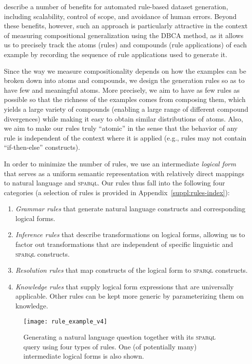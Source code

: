 \documentclass[letterpaper]{article}
\newcommand{\SPARQL}{\textsc{sparql}}
\begin{document}
\citet{saxton2019mathematics} describe a number of benefits for automated rule-based dataset generation, including scalability, control of scope, and avoidance of human errors. Beyond these benefits, however, such an approach is particularly attractive in the context of measuring compositional generalization using the DBCA method, as it allows us to precisely track the atoms (rules) and compounds (rule applications) of each example by recording the sequence of rule applications used to generate it.

Since the way we measure compositionality depends on how the examples can be broken down into atoms and compounds, we design the generation rules so as to have few and meaningful atoms. 
More precisely, we aim to have as few rules as possible so that the richness of the examples comes from composing them, which yields a large variety of compounds (enabling a large range of different compound divergences) while making it easy to obtain similar distributions of atoms.
Also, we aim to make our rules truly ``atomic'' in the sense that the behavior of any rule is independent of the context where it is applied (e.g., rules may not contain ``if-then-else'' constructs).



In order to minimize the number of rules, we use an intermediate {\em logical form} that serves as a uniform semantic representation with relatively direct mappings to natural language and \SPARQL{}. Our rules thus fall into the following four categories (a selection of rules is provided in Appendix~\ref{suppl:rules-index}):
\begin{enumerate}
    \item {\em Grammar rules} that generate natural language constructs and corresponding logical forms.
    \item {\em Inference rules} that describe transformations on logical forms, allowing us to factor out transformations that are independent of specific linguistic and \SPARQL{} constructs.
    \item {\em Resolution rules} that map constructs of the logical form to \SPARQL{} constructs.
    \item {\em Knowledge rules} 
    that supply logical form expressions that are universally applicable.
    Other rules can be kept more generic by parameterizing them on knowledge.
\end{enumerate}

\begin{figure}[tb]
  \centering
  \texttt{[image: rule\_example\_v4]}
  \caption{Generating a natural language question together with its \SPARQL{} query using four types of rules. One (of potentially many) intermediate logical forms is also shown.}
  \label{fig:rules-example}
\end{figure}
\end{document}
